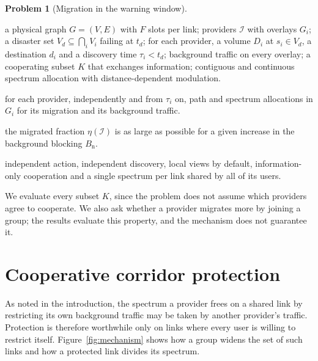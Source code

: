 \documentclass[11pt,a4paper]{article}
\theoremstyle{definition}
\newtheorem{problem}{Problem}
\begin{document}
\noindent\begin{minipage}{\linewidth}
\begin{problem}[Migration in the warning window]
\hfill
\begin{description}[leftmargin=1.6cm,style=nextline]
  \item[Given]
  a physical graph $G=(V,E)$ with $F$ slots per link;
  providers $\mathcal{I}$ with overlays $G_i$;
  a disaster set $V_d\subseteq\bigcap_i V_i$ failing at $t_d$;
  for each provider, a volume $D_i$ at $s_i\in V_d$, a destination $d_i$ and a discovery time $\tau_i<t_d$;
  background traffic on every overlay;
  a cooperating subset $K$ that exchanges information;
  contiguous and continuous spectrum allocation with distance-dependent modulation.
  \item[Find]
  for each provider, independently and from $\tau_i$ on, path and spectrum allocations in $G_i$ for its migration and its background traffic.
  \item[Such that]
  the migrated fraction $\eta(\mathcal{I})$ is as large as possible for a given increase in the background blocking $B_\mathrm{n}$.
  \item[Under]
  independent action, independent discovery, local views by default, information-only cooperation and a single spectrum per link shared by all of its users.
\end{description}
\end{problem}
\end{minipage}
\medskip

We evaluate every subset $K$, since the problem does not assume which providers agree to cooperate.
We also ask whether a provider migrates more by joining a group; the results evaluate this property, and the mechanism does not guarantee it.

\section{Cooperative corridor protection}
\label{sec:mechanism}

As noted in the introduction, the spectrum a provider frees on a shared link by restricting its own background traffic may be taken by another provider's traffic.
Protection is therefore worthwhile only on links where every user is willing to restrict itself.
Figure~\ref{fig:mechanism} shows how a group widens the set of such links and how a protected link divides its spectrum.
\end{document}
